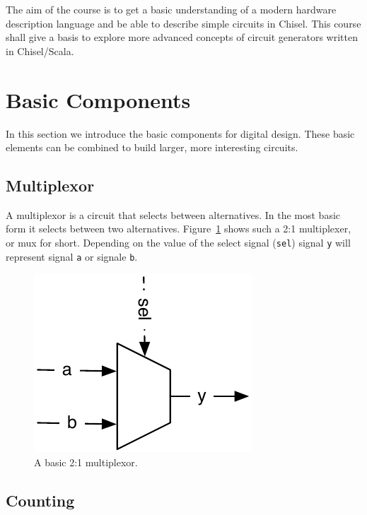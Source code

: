 \documentclass[a4paper]{article}
\newcommand{\code}[1]{{\small{\texttt{#1}}}}
\begin{document}
The aim of the course is to get a basic understanding of a modern hardware description language and be able to describe simple circuits in Chisel. This course shall give a basis to explore more advanced concepts of circuit generators written in Chisel/Scala.

%

\section{Basic Components}

In this section we introduce the basic components for digital design.
These basic elements can be combined to build larger, more interesting
circuits.

\subsection{Multiplexor}

A multiplexor is a circuit that selects between alternatives. In the most
basic form it selects between two alternatives. Figure~\ref{fig:mux} shows
such a 2:1 multiplexer, or mux for short. Depending on the value of the
select signal (\code{sel}) signal \code{y} will represent signal \code{a} or
signale \code{b}.

\begin{figure}
  \centering
  \includegraphics{figures/mux}

  \caption{A basic 2:1 multiplexor.}
  \label{fig:mux}
\end{figure}


\subsection{Counting}
\end{document}
